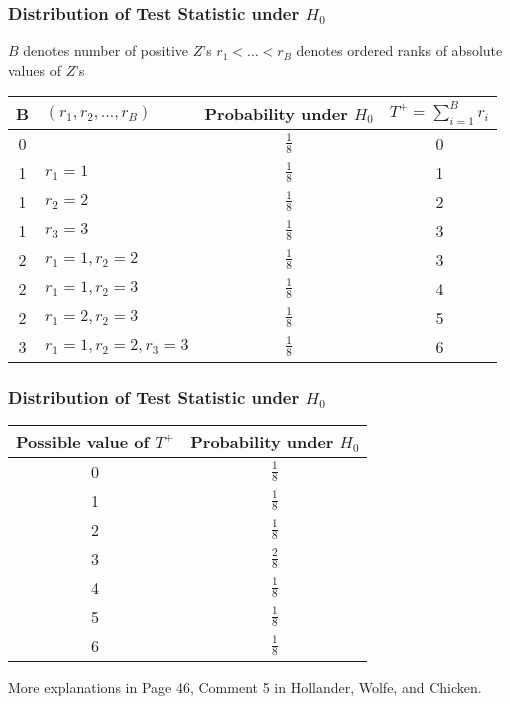 \documentclass[10pt]{beamer}
\begin{document}
\begin{frame}
\frametitle{Distribution of Test Statistic under $H_0$}

$B$ denotes number of positive $Z$'s \newline
$r_1 < \dots < r_B$ denotes ordered ranks of absolute values of $Z$'s \newline

\centering
\renewcommand{\arraystretch}{1.5}
\small
\begin{tabular}{c|l|c|c}
B & $(r_1,r_2,\dots,r_B)$ & Probability under $H_0$ & $T^+ = \sum_{i=1}^B r_i$\\
\hline
0	&	&	$\frac{1}{8}$	&	0 \\
1	&	$r_1 = 1$		&	$\frac{1}{8}$	&	1 \\
1	&	$r_2 = 2$		&	$\frac{1}{8}$	&	2 \\
1	&	$r_3 = 3$		&	$\frac{1}{8}$	&	3 \\
2	&	$r_1 = 1,r_2 = 2$		&	$\frac{1}{8}$	&	3 \\
2	&	$r_1 = 1,r_2 = 3$		&	$\frac{1}{8}$	&	4 \\
2	&	$r_1 = 2,r_2 = 3$		&	$\frac{1}{8}$	&	5 \\
3	&	$r_1 = 1,r_2 = 2,r_3 = 3$		&	$\frac{1}{8}$	&	6 \\
\end{tabular}

\end{frame}

\begin{frame}
\frametitle{Distribution of Test Statistic under $H_0$}

\centering
\renewcommand{\arraystretch}{1.5}
\small
\begin{tabular}{c|c}
Possible value of $T^+$ & Probability under $H_0$ \\
\hline
0	&	$\frac{1}{8}$ \\
1	&	$\frac{1}{8}$ \\
2	&	$\frac{1}{8}$ \\
3	&	$\frac{2}{8}$ \\
4	&	$\frac{1}{8}$ \\
5	&	$\frac{1}{8}$ \\
6	&	$\frac{1}{8}$ \\
\end{tabular}

\vspace{1cm}
More explanations in Page 46, Comment 5 in Hollander, Wolfe, and Chicken.

\end{frame}
\end{document}
